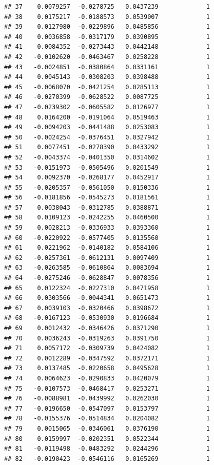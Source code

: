 \documentclass[12pt]{article}\usepackage[]{graphicx}\usepackage[]{xcolor}
\makeatletter
\newenvironment{kframe}{%
 \def\at@end@of@kframe{}%
 \ifinner\ifhmode%
  \def\at@end@of@kframe{\end{minipage}}%
  \begin{minipage}{\columnwidth}%
 \fi\fi%
 \def\FrameCommand##1{\hskip\@totalleftmargin \hskip-\fboxsep
 \colorbox{shadecolor}{##1}\hskip-\fboxsep
     \hskip-\linewidth \hskip-\@totalleftmargin \hskip\columnwidth}%
 \MakeFramed {\advance\hsize-\width
   \@totalleftmargin\z@ \linewidth\hsize
   \@setminipage}}%
 {\par\unskip\endMakeFramed%
 \at@end@of@kframe}
\newenvironment{knitrout}{}{} %
\makeatother
\begin{document}
\begin{knitrout}
\begin{kframe}
\begin{verbatim}
## 37    0.0079257  -0.0278725   0.0437239             1
## 38    0.0175217  -0.0188573   0.0539007             1
## 39    0.0127980  -0.0229896   0.0485856             1
## 40    0.0036858  -0.0317179   0.0390895             1
## 41    0.0084352  -0.0273443   0.0442148             1
## 42   -0.0102620  -0.0463467   0.0258228             1
## 43   -0.0024851  -0.0380864   0.0331161             1
## 44    0.0045143  -0.0308203   0.0398488             1
## 45   -0.0068070  -0.0421254   0.0285113             1
## 46   -0.0270399  -0.0628522   0.0087725             1
## 47   -0.0239302  -0.0605582   0.0126977             1
## 48    0.0164200  -0.0191064   0.0519463             1
## 49   -0.0094203  -0.0441488   0.0253083             1
## 50   -0.0024254  -0.0376451   0.0327942             1
## 51    0.0077451  -0.0278390   0.0433292             1
## 52   -0.0043374  -0.0401350   0.0314602             1
## 53   -0.0151973  -0.0505496   0.0201549             1
## 54    0.0092370  -0.0268177   0.0452917             1
## 55   -0.0205357  -0.0561050   0.0150336             1
## 56   -0.0181856  -0.0545273   0.0181561             1
## 57    0.0038043  -0.0312785   0.0388871             1
## 58    0.0109123  -0.0242255   0.0460500             1
## 59    0.0028213  -0.0336933   0.0393360             1
## 60   -0.0220922  -0.0577405   0.0135560             1
## 61    0.0221962  -0.0140182   0.0584106             1
## 62   -0.0257361  -0.0612131   0.0097409             1
## 63   -0.0263585  -0.0610864   0.0083694             1
## 64   -0.0275246  -0.0628847   0.0078356             1
## 65    0.0122324  -0.0227310   0.0471958             1
## 66    0.0303566  -0.0044341   0.0651473             1
## 67    0.0039103  -0.0320466   0.0398672             1
## 68   -0.0167123  -0.0530930   0.0196684             1
## 69    0.0012432  -0.0346426   0.0371290             1
## 70    0.0036243  -0.0319263   0.0391750             1
## 71    0.0057172  -0.0309739   0.0424082             1
## 72    0.0012289  -0.0347592   0.0372171             1
## 73    0.0137485  -0.0220658   0.0495628             1
## 74    0.0064623  -0.0290833   0.0420079             1
## 75   -0.0107573  -0.0468417   0.0253271             1
## 76   -0.0088981  -0.0439992   0.0262030             1
## 77   -0.0196650  -0.0547097   0.0153797             1
## 78   -0.0155376  -0.0514834   0.0204082             1
## 79    0.0015065  -0.0346061   0.0376190             1
## 80    0.0159997  -0.0202351   0.0522344             1
## 81   -0.0119498  -0.0483292   0.0244296             1
## 82   -0.0190423  -0.0546116   0.0165269             1

\end{verbatim}
\end{kframe}
\end{knitrout}
\end{document}
